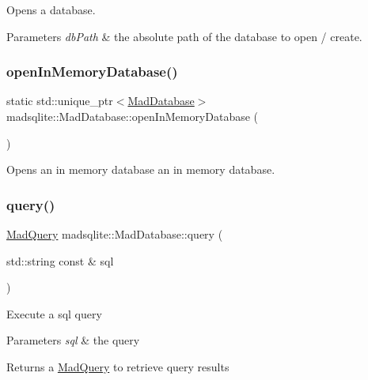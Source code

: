Opens a database. 
\begin{DoxyParams}{Parameters}
{\em db\+Path} & the absolute path of the database to open / create. \\
\hline
\end{DoxyParams}
\hypertarget{classmadsqlite_1_1_mad_database_a29c3ca4b75520e39977ca37ea71354b6}{}\label{classmadsqlite_1_1_mad_database_a29c3ca4b75520e39977ca37ea71354b6} 
\subsubsection{\texorpdfstring{open\+In\+Memory\+Database()}{openInMemoryDatabase()}}
{\footnotesize\ttfamily static std\+::unique\+\_\+ptr$<$\hyperlink{classmadsqlite_1_1_mad_database}{Mad\+Database}$>$ madsqlite\+::\+Mad\+Database\+::open\+In\+Memory\+Database (\begin{DoxyParamCaption}{ }\end{DoxyParamCaption})\hspace{0.3cm}{\ttfamily [static]}}

Opens an in memory database an in memory database. \hypertarget{classmadsqlite_1_1_mad_database_a6fb119ea383a9d93b7d3a5ddce7bc756}{}\label{classmadsqlite_1_1_mad_database_a6fb119ea383a9d93b7d3a5ddce7bc756} 
\subsubsection{\texorpdfstring{query()}{query()}\hspace{0.1cm}{\footnotesize\ttfamily [1/2]}}
{\footnotesize\ttfamily \hyperlink{classmadsqlite_1_1_mad_query}{Mad\+Query} madsqlite\+::\+Mad\+Database\+::query (\begin{DoxyParamCaption}\item[{std\+::string const \&}]{sql }\end{DoxyParamCaption})}

Execute a sql query


\begin{DoxyParams}{Parameters}
{\em sql} & the query \\
\hline
\end{DoxyParams}
\begin{DoxyReturn}{Returns}
a \hyperlink{classmadsqlite_1_1_mad_query}{Mad\+Query} to retrieve query results 
\end{DoxyReturn}
\hypertarget{classmadsqlite_1_1_mad_database_a6514212d65ca428fb35ee87b9d3c78af}{}\label{classmadsqlite_1_1_mad_database_a6514212d65ca428fb35ee87b9d3c78af} 
